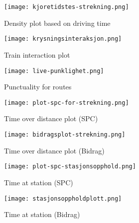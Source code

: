 
\begin{figure}[!htbp]
	\texttt{[image: kjoretidstes-strekning.png]}
	\caption[Density plot based on driving time]{Density plot based on driving time \cite{sintefPresis}}
	\label{fig:kjoretidstes-strekning}
\end{figure}
\pagebreak

\begin{figure}[!htbp]
	\texttt{[image: krysningsinteraksjon.png]}
	\caption[Train interaction plot]{Train interaction plot \cite{sintefPresis}}
	\label{fig:krysningsinteraksjon}
\end{figure}
\pagebreak

\begin{figure}[!htbp]
	\texttt{[image: live-punklighet.png]}
	\caption[Punctuality for routes]{Punctuality for routes \cite{sintefPresis}}
	\label{fig:live-punklighet}
\end{figure}
\pagebreak

\begin{figure}[!htbp]
	\texttt{[image: plot-spc-for-strekning.png]}
	\caption[Time over distance plot (SPC)]{Time over distance plot (SPC) \cite{sintefPresis}}
	\label{fig:plot-spc-for-strekning}
\end{figure}
\pagebreak

\begin{figure}[!htbp]
	\texttt{[image: bidragsplot-strekning.png]}
	\caption[Time over distance plot (Bidrag)]{Time over distance plot (Bidrag) \cite{sintefPresis}}
	\label{fig:bidragsplot-strekning}
\end{figure}
\pagebreak

\begin{figure}[!htbp]
	\texttt{[image: plot-spc-stasjonsopphold.png]}
	\caption[Time at station (SPC)]{Time at station (SPC) \cite{sintefPresis}}
	\label{fig:plot-spc-for-stasjonsopphold}
\end{figure}
\pagebreak

\begin{figure}[!htbp]
	\texttt{[image: stasjonsoppholdplott.png]}
	\caption[Time at station (Bidrag)]{Time at station (Bidrag) \cite{sintefPresis}}
	\label{fig:stasjonsoppholdplott}
\end{figure}
\pagebreak

